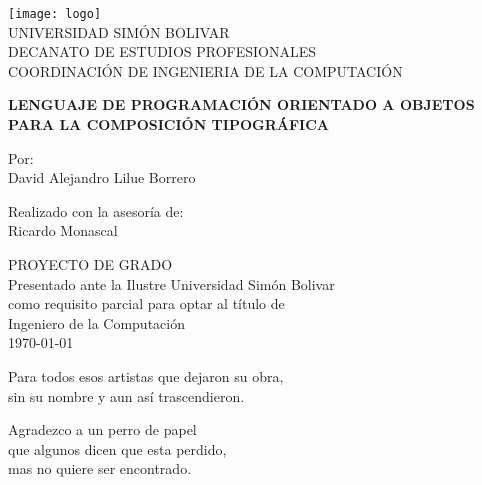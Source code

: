 \documentclass[12pt,letterpaper,titlepage,oneside,openright]{book}
\begin{document}
\frontmatter

\begin{titlepage}
    \begin{center}
        \texttt{[image: logo]}\\
        {\large UNIVERSIDAD SIMÓN BOLIVAR}\\
        DECANATO DE ESTUDIOS PROFESIONALES\\
        COORDINACIÓN DE INGENIERIA DE LA COMPUTACIÓN
        
        \vspace{4em}

        \textbf{LENGUAJE DE PROGRAMACIÓN ORIENTADO A OBJETOS PARA LA COMPOSICIÓN TIPOGRÁFICA}
        
        \vspace{4em}
        Por:\\
        David Alejandro Lilue Borrero\\
        
        \vspace{4em}

        Realizado con la asesoría de:\\
        Ricardo Monascal\\

        \vspace{4em}

        PROYECTO DE GRADO\\
        Presentado ante la Ilustre Universidad Simón Bolivar\\
        como requisito parcial para optar al título de\\
        Ingeniero de la Computación\\
        
        \vfill
        \today
    \end{center}
\end{titlepage}

\cleardoublepage
{}
{}
\begin{flushright}
Para todos esos artistas que dejaron su obra, \\ sin su nombre y aun así trascendieron.
\end{flushright}

\newpage

\cleardoublepage
{}
{}
\begin{flushleft}
Agradezco a un perro de papel \\
que algunos dicen que esta perdido, \\
mas no quiere ser encontrado.
\end{flushleft}
\end{document}
